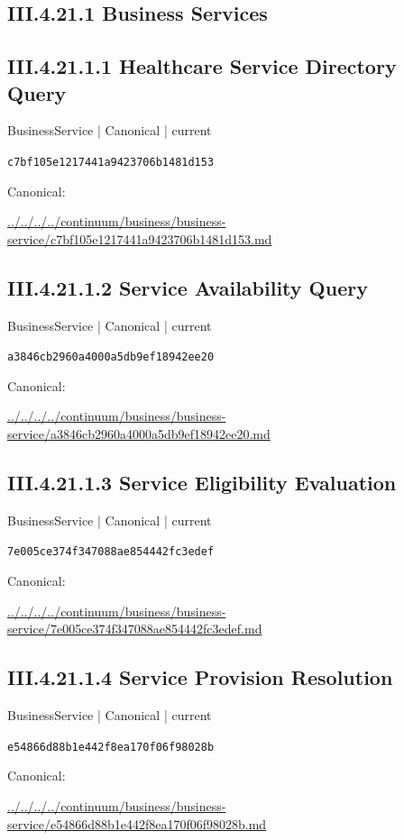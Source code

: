 \documentclass[10pt,a4paper]{article}
\begin{document}
\subsection*{III.4.21.1 Business Services}
\subsection*{III.4.21.1.1 Healthcare Service Directory Query}
{\small BusinessService | Canonical | current}\par
\texttt{c7bf105e1217441a9423706b1481d153}\par
Canonical: \par
{\footnotesize\url{../../../../continuum/business/business-service/c7bf105e1217441a9423706b1481d153.md}}\par
\subsection*{III.4.21.1.2 Service Availability Query}
{\small BusinessService | Canonical | current}\par
\texttt{a3846cb2960a4000a5db9ef18942ee20}\par
Canonical: \par
{\footnotesize\url{../../../../continuum/business/business-service/a3846cb2960a4000a5db9ef18942ee20.md}}\par
\subsection*{III.4.21.1.3 Service Eligibility Evaluation}
{\small BusinessService | Canonical | current}\par
\texttt{7e005ce374f347088ae854442fc3edef}\par
Canonical: \par
{\footnotesize\url{../../../../continuum/business/business-service/7e005ce374f347088ae854442fc3edef.md}}\par
\subsection*{III.4.21.1.4 Service Provision Resolution}
{\small BusinessService | Canonical | current}\par
\texttt{e54866d88b1e442f8ea170f06f98028b}\par
Canonical: \par
{\footnotesize\url{../../../../continuum/business/business-service/e54866d88b1e442f8ea170f06f98028b.md}}\par
\end{document}
